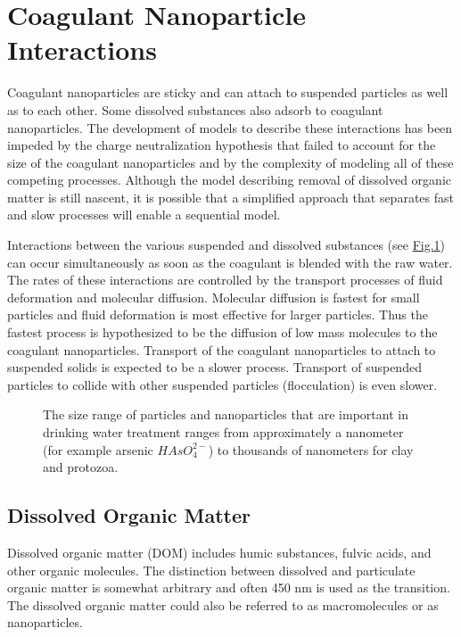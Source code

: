 \documentclass[letterpaper,10pt,english]{sphinxmanual}
\let\sphinxpxdimen\pdfpxdimen\else\newdimen\sphinxpxdimen
\begin{document}
\section{Coagulant Nanoparticle Interactions}
\label{\detokenize{Rapid_Mix/RM_Intro:coagulant-nanoparticle-interactions}}\label{\detokenize{Rapid_Mix/RM_Intro:heading-coagulant-nanoparticle-interactions}}
Coagulant nanoparticles are sticky and can attach to suspended particles as well as to each other. Some dissolved substances also adsorb to coagulant nanoparticles. The development of models to describe these interactions has been impeded by the charge neutralization hypothesis that failed to account for the size of the coagulant nanoparticles and by the complexity of modeling all of these competing processes. Although the model describing removal of dissolved organic matter is still nascent, it is possible that a simplified approach that separates fast and slow processes will enable a sequential model.

Interactions between the various suspended and dissolved substances (see \hyperref[\detokenize{Rapid_Mix/RM_Intro:figure-particle-sizes}]{Fig.\@ \ref{\detokenize{Rapid_Mix/RM_Intro:figure-particle-sizes}}}) can occur simultaneously as soon as the coagulant is blended with the raw water. The rates of these interactions are controlled by the transport processes of fluid deformation and molecular diffusion. Molecular diffusion is fastest for small particles and fluid deformation is most effective for larger particles. Thus the fastest process is hypothesized to be the diffusion of low mass molecules to the coagulant nanoparticles. Transport of the coagulant nanoparticles to attach to suspended solids is expected to be a slower process. Transport of suspended particles to collide with other suspended particles (flocculation) is even slower.

\begin{figure}[htbp]
\centering
\capstart

\noindent\sphinxincludegraphics[width=400\sphinxpxdimen]{{Particle_sizes}.png}
\caption{The size range of particles and nanoparticles that are important in drinking water treatment ranges from approximately a nanometer (for example arsenic \(HAsO_4^{2-}\)) to thousands of nanometers for clay and protozoa.}\label{\detokenize{Rapid_Mix/RM_Intro:id12}}\label{\detokenize{Rapid_Mix/RM_Intro:figure-particle-sizes}}\end{figure}


\subsection{Dissolved Organic Matter}
\label{\detokenize{Rapid_Mix/RM_Intro:dissolved-organic-matter}}\label{\detokenize{Rapid_Mix/RM_Intro:heading-dissolved-organic-matter-and-coagulant}}
Dissolved organic matter (DOM) includes humic substances, fulvic acids, and other organic molecules. The distinction between dissolved and particulate organic matter is somewhat arbitrary and often 450 nm is used as the transition.  The dissolved organic matter could also be referred to as macromolecules or as nanoparticles.
\end{document}
